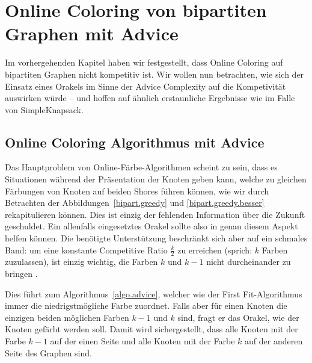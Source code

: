 \documentclass[11pt,abstracton]{scrreprt} %
\theoremstyle{definition}
\begin{document}
\begin{figure}
\begin{center}
\end{center}
\end{figure}


\chapter{Online Coloring von bipartiten Graphen mit Advice}

Im vorhergehenden Kapitel haben wir festgestellt, dass Online Coloring auf bipartiten Graphen nicht kompetitiv ist. Wir wollen nun betrachten, wie sich der Einsatz eines Orakels im Sinne der Advice Complexity auf die Kompetivität auswirken würde -- und hoffen auf ähnlich erstaunliche Ergebnisse wie im Falle von {\sc SimpleKnapsack}.

\section{Online Coloring Algorithmus mit Advice}

\bigskip
Das Hauptproblem von Online-Färbe-Algorithmen scheint zu sein, dass es Situationen während der Präsentation der Knoten geben kann, welche zu gleichen Färbungen von Knoten auf beiden Shores führen können, wie wir durch Betrachten der Abbildungen~\ref{bipart.greedy} und \ref{bipart.greedy.besser} rekapitulieren können. Dies ist einzig der fehlenden Information über die Zukunft geschuldet. Ein allenfalls eingesetztes Orakel sollte also in genau diesem Aspekt helfen können. Die benötigte Unterstützung beschränkt sich aber auf ein schmales Band: um eine konstante Competitive Ratio $\frac k 2$ zu erreichen (sprich: $k$ Farben zuzulassen), ist einzig wichtig, die Farben $k$ und $k-1$ nicht durcheinander zu bringen \cite{bipartite}.

\bigskip
Dies führt zum Algorithmus~\ref{algo.advice}, welcher wie der First Fit-Algorithmus immer die niedrigstmögliche Farbe zuordnet. Falls aber für einen Knoten die einzigen beiden möglichen Farben $k-1$ und $k$ sind, fragt er das Orakel, wie der Knoten gefärbt werden soll. Damit wird sichergestellt, dass alle Knoten mit der Farbe $k-1$ auf der einen Seite und alle Knoten mit der Farbe $k$ auf der anderen Seite des Graphen sind.
\end{document}
